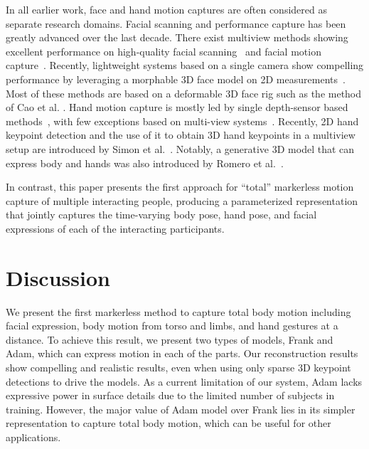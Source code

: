 In all earlier work, face and hand motion captures are often considered as separate research domains.  Facial scanning and performance capture has been greatly advanced over the last decade. There exist multiview methods showing excellent performance on high-quality facial scanning~\cite{beeler2010high,ghosh2011multiview} and facial motion capture~\cite{Beeler2011, bradley2010high, valgaerts2012lightweight}. Recently, lightweight systems based on a single camera show compelling performance by leveraging a morphable 3D face model on 2D measurements~\cite{garrido-tog-2013, Torre15, li2013realtime, thies2016face2face, cao2014facewarehouse, cao2015real, wu2016anatomically}. Most of these methods are based on a deformable 3D face rig such as the method of Cao et al. \cite{cao2014facewarehouse}. Hand motion capture is mostly led by single depth-sensor based methods~\cite{Oikonomidis-12, Tang-14, Tompson-14a, Keskin-12,Xu-13,Sun-15,Wan-16, Sridhar-13, Sharp-15, Sridha-15, Tzionas-16, Ye-16}, with few exceptions based on multi-view systems~\cite{Ballan-12, Sridhar-13, MANO:SIGGRAPHASIA:2017}. Recently, 2D hand keypoint detection and the use of it to obtain 3D hand keypoints in a multiview setup are introduced by Simon et al.~\cite{simon2017hand}. Notably, a generative 3D model that can express body and hands was also introduced by Romero et al.~\cite{MANO:SIGGRAPHASIA:2017}. 

In contrast, this paper presents the first approach for ``total'' markerless motion capture of multiple interacting people, producing a parameterized representation that jointly captures the time-varying body pose, hand pose, and facial expressions of each of the interacting participants. %







\section{Discussion}
We present the first markerless method to capture total body motion including facial expression, body motion from torso and limbs, and hand gestures at a distance. To achieve this result, we present two types of models, Frank and Adam, which can express motion in each of the parts. Our reconstruction results show compelling and realistic results, even when using only sparse 3D keypoint detections to drive the models.  As a current limitation of our system, Adam lacks expressive power in surface details due to the limited number of subjects in training. However, the major value of Adam model over Frank lies in its simpler representation to capture total body motion, which can be useful for other applications.

